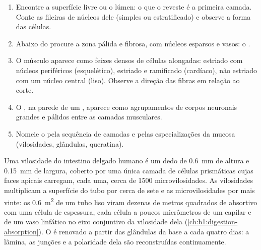 \begin{method}\label{met:b1:body-plans-tissues:histology}
\begin{enumerate}
  \item Encontre a superfície livre ou o lúmen: o  que o reveste
        é a primeira camada. Conte as fileiras de núcleos dele (simples
        ou estratificado) e observe a forma das células.
  \item Abaixo do  procure a zona pálida e fibrosa, com núcleos
        esparsos e vasos: o .
  \item O músculo aparece como feixes densos de células alongadas:
        estriado com núcleos periféricos (esquelético), estriado e
        ramificado (cardíaco), não estriado com um núcleo central
        (liso). Observe a direção das fibras em relação ao corte.
  \item O , na parede de um , aparece como
        agrupamentos de corpos neuronais grandes e pálidos entre as
        camadas musculares.
  \item Nomeie o  pela sequência de camadas e pelas especializações
        da mucosa (vilosidades, glândulas, queratina).
\end{enumerate}
\end{method}

\begin{example}\label{ex:b1:body-plans-tissues:villus}
Uma vilosidade do intestino delgado humano é um dedo de \qty{0.6}{mm} de
altura e \qty{0.15}{mm} de largura, coberto por uma única camada de
células prismáticas cujas faces apicais carregam, cada uma, cerca de
\qty{1500}{} microvilosidades. As vilosidades multiplicam a superfície
do tubo por cerca de sete e as microvilosidades por mais vinte: os
\qty{0.6}{m^2} de um tubo liso viram dezenas de metros quadrados de
 absortivo com uma célula de espessura, cada célula a poucos
micrômetros de um capilar e de um vaso linfático no eixo conjuntivo da
vilosidade dela (\cref{ch:b1:digestion-absorption}). O  é
renovado a partir das glândulas da base a cada quatro dias: a lâmina, as
junções e a polaridade dela são reconstruídas continuamente.
\end{example}

